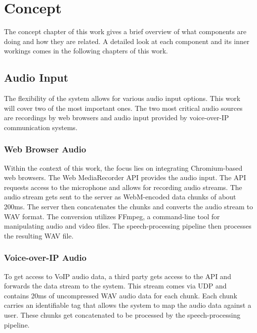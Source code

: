\chapter{Concept}

\label{Concept}

The concept chapter of this work gives a brief overview of what components are doing and how they are related. 
A detailed look at each component and its inner workings comes in the following chapters of this work.



\section{Audio Input}

The flexibility of the system allows for various audio input options. This work will cover two of the most important 
ones. The two most critical audio sources are recordings by web browsers and audio input provided by voice-over-IP 
communication systems.

\subsection{Web Browser Audio}

Within the context of this work, the focus lies on integrating Chromium-based web browsers. The Web MediaRecorder API 
provides the audio input. The API requests access to the microphone and allows for recording audio streams. 
The audio stream gets sent to the server as WebM-encoded data chunks of about 200ms. The server then concatenates the 
chunks and converts the audio stream to WAV format. The conversion utilizes FFmpeg, a command-line tool for 
manipulating audio and video files. The speech-processing pipeline then processes the resulting WAV file.

\subsection{Voice-over-IP Audio}

To get access to VoIP audio data, a third party gets access to the API and forwards the data stream to the system. 
This stream comes via UDP and contains 20ms of uncompressed WAV audio data for each chunk.
Each chunk carries an identifiable tag that allows the system to map the audio data against a user.
These chunks get concatenated to be processed by the speech-processing pipeline.

